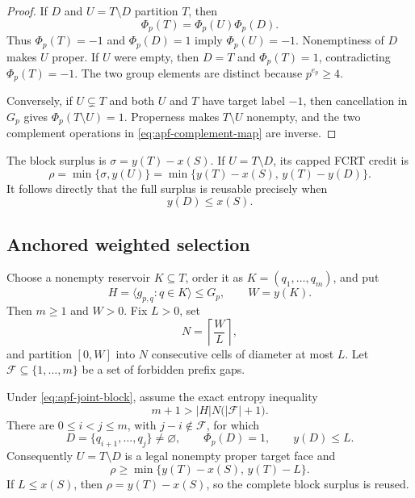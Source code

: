 \begin{proof}
If $D$ and $U=T\setminus D$ partition $T$, then
\[
                         \Phi_p(T)=\Phi_p(U)\Phi_p(D).
\]
Thus $\Phi_p(T)=-1$ and $\Phi_p(D)=1$ imply $\Phi_p(U)=-1$.
Nonemptiness of $D$ makes $U$ proper.  If $U$ were empty, then $D=T$ and
$\Phi_p(T)=1$, contradicting $\Phi_p(T)=-1$.  The two group elements are
distinct because $p^{e_p}\ge4$.

Conversely, if $U\subsetneq T$ and both $U$ and $T$ have target label $-1$,
then cancellation in $G_p$ gives $\Phi_p(T\setminus U)=1$.  Properness makes
$T\setminus U$ nonempty, and the two complement operations in
\eqref{eq:apf-complement-map} are inverse.
\end{proof}

The block surplus is $\sigma=y(T)-x(S)$.  If $U=T\setminus D$, its capped
FCRT credit is
\[
 \rho=\min\{\sigma,y(U)\}
     =\min\{y(T)-x(S),\,y(T)-y(D)\}.
\tag{APF-5}\label{eq:apf-deletion-credit}
\]
It follows directly that the full surplus is reusable precisely when
\[
                              y(D)\le x(S).
\tag{APF-6}\label{eq:apf-full-surplus-condition}
\]

\subsection{Anchored weighted selection}

Choose a nonempty reservoir $K\subseteq T$, order it as
$K=(q_1,\ldots,q_m)$, and put
\[
 H=\langle g_{p,q}:q\in K\rangle\le G_p,
 \qquad W=y(K).
\tag{APF-7}\label{eq:apf-reservoir}
\]
Then $m\ge1$ and $W>0$.  Fix $L>0$, set
\[
                         N=\left\lceil\frac WL\right\rceil,
\tag{APF-8}\label{eq:apf-cell-count}
\]
and partition $[0,W]$ into $N$ consecutive cells of diameter at most $L$.
Let $\mathcal F\subseteq\{1,\ldots,m\}$ be a set of forbidden prefix gaps.

\begin{theorem}
\label{thm:apf-anchored-prefix}
Under \eqref{eq:apf-joint-block}, assume the exact entropy inequality
\[
                  m+1>|H|N\bigl(|\mathcal F|+1\bigr).
\tag{APF-9}\label{eq:apf-entropy}
\]
There are $0\le i<j\le m$, with $j-i\notin\mathcal F$, for which
\[
 D=\{q_{i+1},\ldots,q_j\}\ne\varnothing,\qquad
 \Phi_p(D)=1,\qquad y(D)\le L.
\tag{APF-10}\label{eq:apf-light-deletion}
\]
Consequently $U=T\setminus D$ is a legal nonempty proper target face and
\[
 \rho\ge
 \min\{y(T)-x(S),\,y(T)-L\}.
\tag{APF-11}\label{eq:apf-credit-lower-bound}
\]
If $L\le x(S)$, then $\rho=y(T)-x(S)$, so the complete block surplus is
reused.
\end{theorem}

